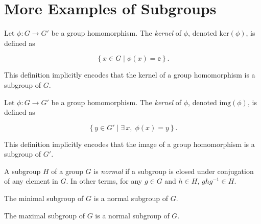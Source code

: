 \section{More Examples of Subgroups}

\begin{definition}
    \label{definition : Kernel}
    \leanok
    Let $\phi : G \rightarrow G'$ be a group homomorphism. The \textit{kernel} of $\phi$, denoted $\text{ker}(\phi)$, is defined as

    $$\left\{ x \in G \middle| \phi(x) = \mathbb{e} \right\}.$$

    This definition implicitly encodes that the kernel of a group homomorphism is a subgroup of $G$.
\end{definition}

\begin{definition}
    \label{definition : Image}
    \leanok
    Let $\phi : G \rightarrow G'$ be a group homomorphism. The \textit{kernel} of $\phi$, denoted $\text{img}(\phi)$, is defined as

    $$\left\{ y \in G' \middle| \exists\,x,\;\phi(x) = y \right\}.$$

    This definition implicitly encodes that the image of a group homomorphism is a subgroup of $G'$.
\end{definition}

\begin{definition}
    \label{definition : normal}
    \leanok
    A subgroup $H$ of a group $G$ is \textit{normal} if a subgroup is closed under conjugation of any element in $G$. In other terms, for any $g \in G$ and $h \in H$, $ghg^{-1} \in H$.
\end{definition}

\begin{theorem}
    \label{theorem : Minimal_normal}
    \leanok
    The minimal subgroup of $G$ is a normal subgroup of $G$.
\end{theorem}

\begin{theorem}
    \label{theorem : Maximal_normal}
    \leanok
    The maximal subgroup of $G$ is a normal subgroup of $G$.
\end{theorem}

